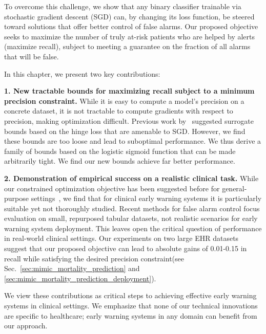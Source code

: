 To overcome this challenge, we show that any binary classifier trainable via stochastic gradient descent (SGD) can, by changing its loss function, be steered toward solutions that offer better control of false alarms. 
Our proposed objective seeks to maximize the number of truly at-risk patients who are helped by alerts (maximize recall), subject to meeting a guarantee on the fraction of all alarms that will be false.


In this chapter, we present two key contributions:
 

\textbf{1. New tractable bounds for maximizing recall subject to a minimum precision constraint.} 
While it is easy to compute a model's precision on a concrete dataset, it is not tractable to compute gradients with respect to precision, making optimization difficult.
Previous work by~\citet{ebanScalableLearningNonDecomposable2017} suggested surrogate bounds based on the hinge loss that are amenable to SGD.
However, we find these bounds are too loose and lead to suboptimal performance. 
We thus derive a family of bounds based on the logistic sigmoid function that can be made arbitrarily tight.
We find our new bounds achieve far better performance.


\textbf{2. Demonstration of empirical success on a realistic clinical task.} 
While our constrained optimization objective has been suggested before for general-purpose settings~\citep{ebanScalableLearningNonDecomposable2017}, we find that for clinical early warning systems it is particularly suitable yet not thoroughly studied.
Recent methods for false alarm control \citep{fathonyAPperfIncorporatingGeneric2020,tsoiHeavisideFunctionApproximation2021} focus evaluation on small, repurposed tabular datasets, not realistic scenarios for early warning system deployment.
This leaves open the critical question of performance in real-world clinical settings.
Our experiments on two large EHR datasets suggest that our proposed objective can lead to absolute gains of 0.01-0.15 in recall while satisfying the desired precision constraint(see Sec.~\ref{sec:mimic_mortality_prediction} and \ref{sec:mimic_mortality_prediction_deployment}). 

We view these contributions as critical steps to achieving effective early warning systems in clinical settings. We emphasize that none of our technical innovations are specific to healthcare; early warning systems in any domain can benefit from our approach.